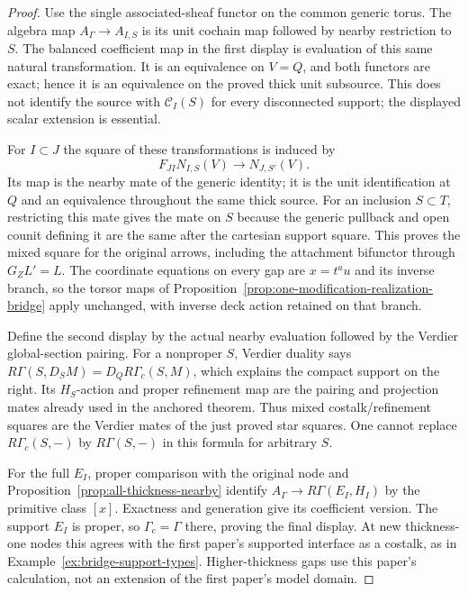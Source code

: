 \documentclass[11pt]{article}
\theoremstyle{definition}
\theoremstyle{remark}
\begin{document}
\begin{proof}
Use the single associated-sheaf functor on the common generic torus.
The algebra map $A_\Gamma\to A_{I,S}$ is its unit cochain map followed
by nearby restriction to $S$.  The balanced coefficient map in the
first display is evaluation of this same natural transformation.
It is an equivalence on $V=Q$, and both functors are exact; hence it
is an equivalence on the proved thick unit subsource.  This does not
identify the source with $\mathcal C_I(S)$ for every disconnected
support; the displayed scalar extension is essential.

For $I\subset J$ the square of these transformations is induced by
\[
 F_{JI}N_{I,S}(V)\longrightarrow N_{J,S'}(V).
\]
Its map is the nearby mate of the generic identity; it is the unit
identification at $Q$ and an equivalence throughout the same thick
source.  For an inclusion $S\subset T$, restricting this mate gives
the mate on $S$ because the generic pullback and open counit defining
it are the same after the cartesian support square.  This proves the
mixed square for the original arrows, including the attachment
bifunctor through $G_ZL'=L$.  The coordinate equations on every gap
are $x=t^a u$ and its inverse branch, so the torsor maps of
Proposition~\ref{prop:one-modification-realization-bridge} apply
unchanged, with inverse deck action retained on that branch.

Define the second display by the actual nearby evaluation followed
by the Verdier global-section pairing.  For a nonproper $S$, Verdier
duality says $R\Gamma(S,D_SM)=D_QR\Gamma_c(S,M)$, which explains
the compact support on the right.  Its $H_S$-action and proper
refinement map are the pairing and projection mates already used in
the anchored theorem.  Thus mixed costalk/refinement squares are the
Verdier mates of the just proved star squares.  One cannot replace
$R\Gamma_c(S,-)$ by $R\Gamma(S,-)$ in this formula for arbitrary $S$.

For the full $E_I$, proper comparison with the original node and
Proposition~\ref{prop:all-thickness-nearby} identify
$A_\Gamma\to R\Gamma(E_I,H_I)$ by the primitive class $[x]$.
Exactness and generation give its coefficient version.  The support
$E_I$ is proper, so $\Gamma_c=\Gamma$ there, proving the final display.
At new thickness-one nodes this agrees with the first paper's
supported interface as a costalk, as in Example~\ref{ex:bridge-support-types}.
Higher-thickness gaps use this paper's calculation, not an extension
of the first paper's model domain.


\end{proof}
\end{document}
